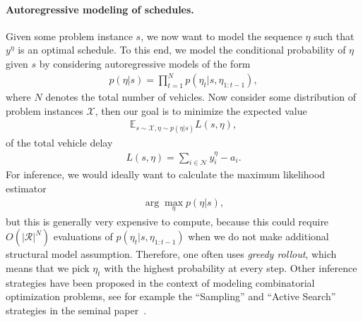 \documentclass[a4paper]{article}
\theoremstyle{definition}
\theoremstyle{plain}
\begin{document}
\paragraph{Autoregressive modeling of schedules.}
Given some problem instance $s$, we now want to model the sequence $\eta$ such
that $y^{\eta}$ is an optimal schedule. To this end, we model the conditional
probability of $\eta$ given $s$ by considering autoregressive models of the form
\begin{align}
  \label{eq:autoregressive}
  p(\eta | s) = \prod_{t=1}^{N} p(\eta_{t} | s, \eta_{1:t-1}) ,
\end{align}
where $N$ denotes the total number of vehicles. Now consider some distribution
of problem instances $\mathcal{X}$, then our goal is to minimize the expected
value
\begin{align*}
  \mathbb{E}_{s \sim \mathcal{X}, \eta \sim p(\eta | s)} L(s, \eta) ,
\end{align*}
of the total vehicle delay
\begin{align*}
  L(s, \eta) = \sum_{i \in \mathcal{N}} y^{\eta}_{i} - a_{i} .
\end{align*}
%
For inference, we would ideally want to calculate the maximum likelihood
estimator
\begin{align*}
  \arg\max_{\eta} p(\eta | s) ,
\end{align*}
but this is generally very expensive to compute, because this could require
$O(|\mathcal{R}|^{N})$ evaluations of $p(\eta_{t} | s, \eta_{1:t-1})$ when we do
not make additional structural model assumption. Therefore, one often uses
\textit{greedy rollout}, which means that we pick $\eta_{t}$ with the highest
probability at every step.
Other inference strategies have been proposed in the context of modeling
combinatorial optimization problems, see for example the ``Sampling'' and
``Active Search'' strategies in the seminal
paper~\cite{belloNeuralCombinatorialOptimization2017}.
\end{document}
